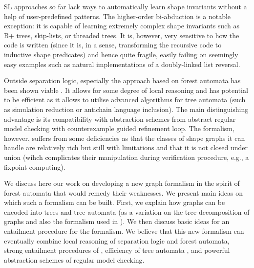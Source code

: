 {SL approaches so far lack ways to automatically learn shape invariants without a help of user-predefined patterns.
%
The higher-order bi-abduction \cite{locle:secondorder} is a notable exception: it is capable of learning extremely complex shape invariants such as B+ trees, skip-lists, or threaded trees.
%
It is, however, very sensitive to how the code is written (since it is, in a sense, transforming the recursive code to inductive shape predicates) and hence quite fragile, easily failing on seemingly easy examples such as natural implementations of a doubly-linked list reversal.

Outside separation logic, especially the approach based on forest automata \cite{forester11,forester12,holik_boxes_2013,vmcai17} has been shown viable \cite{svcomp15-forester,holik_run_2016,holik_forester_2017}. It allows for some degree of local reasoning and has potential to be efficient as it allows to utilise advanced algorithms for tree automata (such as simulation reduction or antichain language inclusion). The main distinguishing advantage is its compatibility with abstraction schemes from abstract regular model checking \cite{svcomp15-forester} with counterexample guided refinement loop. The formalism, however, suffers from some deficiencies as that the classes of shape graphs it can handle are relatively rich but still with limitations
and that it is not closed under union (wihch complicates their manipulation during verification procedure, e.g., a fixpoint computing).

We discuss here our work on developing a new graph formalism in the spirit of forest automata that would remedy their weaknesses.
%
We present main ideas on which such a formalism can be built.
First, we explain how graphs can be encoded into trees and tree automata (as a variation on the tree decomposition of graphs \cite{Courcelle} and also the formalism used in \cite{iosif_treewidth_2013,iosif_deciding_2014}).
We then discuss basic ideas for an entailment procedure for the formalism.
%
We believe that this new formalism can eventually combine local reasoning of separation logic and forest automata, strong entailment procedures of \cite{Katelaan:seplog,pagel,Iosif:CSL,Iosif:LPAR}, efficiency of tree automata \cite{tacas10,almeida_reduction_2016,abdulla_computing_2008,libvata}, and powerful abstraction schemes of regular model checking.

}
